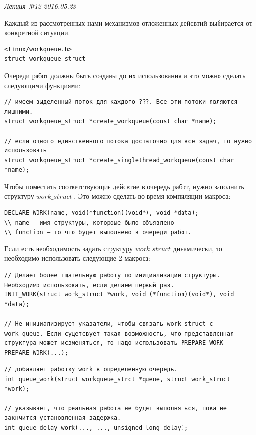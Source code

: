 \clearpage
\begin{flushright}
	\textit{Лекция №12}
	\textit{2016.05.23}
\end{flushright}

Каждый из рассмотренных нами механизмов отложенных дейсвтий выбирается от конкретной ситуации.

 
\begin{lstlisting}[caption=Очереди работ определяются структурой]
<linux/workqueue.h>
struct workqueue_struct
\end{lstlisting}

Очереди работ должны быть созданы до их использования и это можно сделать следующими функциями:
\begin{lstlisting}[caption=Создание очереди работ]
// имеем выделенный поток для каждого ???. Все эти потоки являются лишними.
struct workqueue_struct *create_workqueue(const char *name);

// если одного единственного потока достаточно для все задач, то нужно использовать
struct workqueue_struct *create_singlethread_workqueue(const char *name);
\end{lstlisting}

Чтобы поместить соответствующие дейсвтие в очередь работ, нужно заполнить структуру $work\_struct$ . Это можно сделать во время компиляции макроса:
\begin{lstlisting}
DECLARE_WORK(name, void(*function)(void*), void *data);
\\ name – имя структуры, котороые было объявлено
\\ function – то что будет выполнено в очереди работ.
\end{lstlisting}

Если есть необходимость задать структуру $work\_struct$ динамически, то необходимо использовать следующие 2 макроса:
\begin{lstlisting}
// Делает более тщательную работу по инициализации структуры. Необходимо использовать, если делаем первый раз.
INIT_WORK(struct work_struct *work, void (*function)(void*), void *data);

// Не инициализирует указатели, чтобы связать work_struct с work_queue. Если сущетсвует такая возможность, что представленная структура может исзменяться, то надо использовать PREPARE_WORK
PREPARE_WORK(...);
\end{lstlisting}

\begin{lstlisting}[caption = Функции для отправки работы в очередь работ, label=code_send_work_queue]
// добавляет работку work в определенную очередь.
int queue_work(struct workqueue_strct *queue, struct work_struct *work);

// указывает, что реальная работа не будет выполняться, пока не закнчится установленная задержка.
int queue_delay_work(..., ..., unsigned long delay);
\end{lstlisting}

